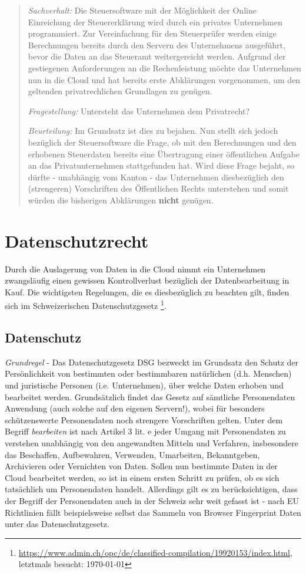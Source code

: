 \documentclass[a4paper,pointlessnumbers]{scrreprt}
\begin{document}
\begin{quote}
\textit{Sachverhalt:} Die Steuersoftware mit der Möglichkeit der Online Einreichung der Steuererklärung wird durch ein privates Unternehmen programmiert. Zur Vereinfachung für den Steuerprüfer werden einige Berechnungen bereits durch den Servern des Unternehmens ausgeführt, bevor die Daten an das Steueramt weitergereicht werden. Aufgrund der gestiegenen Anforderungen an die Rechenleistung möchte das Unternehmen nun in die Cloud und hat bereits erste Abklärungen vorgenommen, um den geltenden privatrechlichen Grundlagen zu genügen.

\textit{Fragestellung:} Untersteht das Unternehmen dem Privatrecht?

\textit{Beurteilung:} Im Grundsatz ist dies zu bejahen. Nun stellt sich jedoch bezüglich der Steuersoftware die Frage, ob mit den Berechnungen und den erhobenen Steuerdaten bereits eine Übertragung einer öffentlichen Aufgabe an das Privatunternehmen stattgefunden hat. Wird diese Frage bejaht, so dürfte - unabhängig vom Kanton - das Unternehmen diesbezüglich den (strengeren) Vorschriften des Öffentlichen Rechts unterstehen und somit würden die bisherigen Abklärungen \textbf{nicht} genügen.
\end{quote}

\section{Datenschutzrecht}
Durch die Auslagerung von Daten in die Cloud nimmt ein Unternehmen zwangsläufig einen gewissen Kontrollverlust bezüglich der Datenbearbeitung in Kauf. Die wichtigsten Regelungen, die es diesbezüglich zu beachten gilt, finden sich im Schweizerischen Datenschutzgesetz \footnote{\href{https://www.admin.ch/opc/de/classified-compilation/19920153/index.html}{https://www.admin.ch/opc/de/classified-compilation/19920153/index.html}, letztmals besucht: \today}.

\subsection{Datenschutz}\label{personendaten}
\textit{Grundregel} - Das Datenschutzgesetz DSG bezweckt im Grundsatz den Schutz der Persönlichkeit von bestimmten oder bestimmbaren natürlichen (d.h. Menschen) und juristische Personen (i.e. Unternehmen), über welche Daten erhoben und bearbeitet werden. Grundsätzlich findet das Gesetz auf sämtliche Personendaten Anwendung (auch solche auf den eigenen Servern!), wobei für besonders schützenswerte Personendaten noch strengere Vorschriften gelten. Unter dem Begriff \textit{bearbeiten} ist nach Artikel 3 lit. e jeder Umgang mit Personendaten zu verstehen unabhängig von den angewandten Mitteln und Verfahren, insbesondere das Beschaffen, Aufbewahren, Verwenden, Umarbeiten, Bekanntgeben, Archivieren oder Vernichten von Daten. Sollen nun bestimmte Daten in der Cloud bearbeitet werden, so ist in einem ersten Schritt zu prüfen, ob es sich tatsächlich um Personendaten handelt. Allerdings gilt es zu berücksichtigen, dass der Begriff der Personendaten auch in der Schweiz sehr weit gefasst ist - nach EU Richtlinien fällt beispielsweise selbst das Sammeln von Browser Fingerprint Daten unter das Datenschutzgesetz. 
\end{document}
